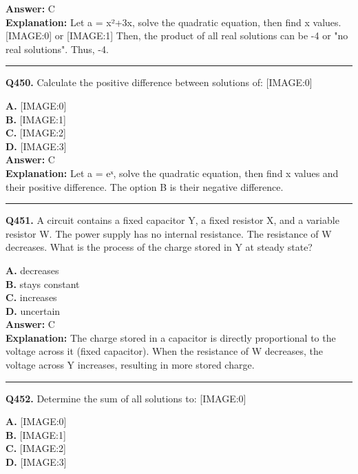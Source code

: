\documentclass[12pt]{article}
\begin{document}
\textbf{Answer:} C \\
\textbf{Explanation:} Let a = x²+3x, solve the quadratic equation, then find x values.
[IMAGE:0]
or
[IMAGE:1]
Then, the product of all real solutions can be -4 or "no real solutions". Thus, -4.

\hrule
\vspace{1em}


\noindent
\textbf{Q450.} Calculate the positive difference between solutions of:
[IMAGE:0]



\textbf{A.} [IMAGE:0] \\
\textbf{B.} [IMAGE:1] \\
\textbf{C.} [IMAGE:2] \\
\textbf{D.} [IMAGE:3] \\

\textbf{Answer:} C \\
\textbf{Explanation:} Let a = eˣ, solve the quadratic equation, then find x values and their positive difference.
The option B is their negative difference.

\hrule
\vspace{1em}


\noindent
\textbf{Q451.} A circuit contains a fixed capacitor Y, a fixed resistor X, and a variable resistor W. The power supply has no internal resistance.
The resistance of W decreases. What is the process of the charge stored in Y at steady state?



\textbf{A.} decreases \\
\textbf{B.} stays constant \\
\textbf{C.} increases \\
\textbf{D.} uncertain \\

\textbf{Answer:} C \\
\textbf{Explanation:} The charge stored in a capacitor is directly proportional to the voltage across it (fixed capacitor). When the resistance of W decreases, the voltage across Y increases, resulting in more stored charge.

\hrule
\vspace{1em}


\noindent
\textbf{Q452.} Determine the sum of all solutions to:
[IMAGE:0]



\textbf{A.} [IMAGE:0] \\
\textbf{B.} [IMAGE:1] \\
\textbf{C.} [IMAGE:2] \\
\textbf{D.} [IMAGE:3] \\
\end{document}

